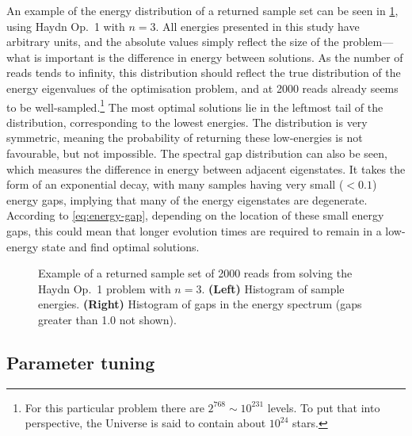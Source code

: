 \documentclass[12pt]{article}
\theoremstyle{definition}
\begin{document}
An example of the energy distribution of a returned sample set can be seen in \cref{fig:histograms}, using Haydn Op.\ 1 with $n=3$. All energies presented in this study have arbitrary units, and the absolute values simply reflect the size of the problem---what is important is the difference in energy between solutions. As the number of reads tends to infinity, this distribution should reflect the true distribution of the energy eigenvalues of the optimisation problem, and at \num{2000} reads already seems to be well-sampled.\footnote{For this particular problem there are $2^{768}\sim 10^{231}$ levels. To put that into perspective, the Universe is said to contain about $10^{24}$ stars.} The most optimal solutions lie in the leftmost tail of the distribution, corresponding to the lowest energies. The distribution is very symmetric, meaning the probability of returning these low-energies is not favourable, but not impossible.
The spectral gap distribution can also be seen, which measures the difference in energy between adjacent eigenstates. It takes the form of an exponential decay, with many samples having very small ($<0.1$) energy gaps, implying that many of the energy eigenstates are degenerate. According to \cref{eq:energy-gap}, depending on the location of these small energy gaps, this could mean that longer evolution times are required to remain in a low-energy state and find optimal solutions.

\begin{figure}[t]
    \centering\footnotesize
    
    \caption{Example of a returned sample set of \num{2000} reads from solving the Haydn Op.\ 1 problem with $n=3$. \textbf{(Left)} Histogram of sample energies. \textbf{(Right)} Histogram of gaps in the energy spectrum (gaps greater than \num{1.0} not shown).}
    \label{fig:histograms}
\end{figure}

\subsection{Parameter tuning}
\end{document}
